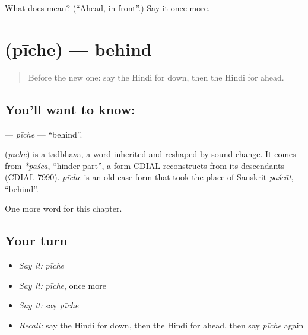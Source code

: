 \begin{tcolorbox}[breakable,colback=teal!4,colframe=teal!35!black,title={Before you move on}]
What does  mean? (\textquotedblleft{}Ahead, in front\textquotedblright{}.) Say it once more.
\end{tcolorbox}
\section[\texorpdfstring{\hi{पीछे} (pīche)}{पीछे (pīche)}]{ (pīche) — behind}

\label{lesson:HI-C235-piche}



\begin{quote}
Before the new one: say the Hindi for down, then the Hindi for ahead.
\end{quote}

\subsection*{You'll want to know: }
\textbf{} — \emph{pīche} — \textquotedblleft{}behind\textquotedblright{}.

\begin{cousinweb}
\textbf{} (\emph{pīche}) is a tadbhava, a word inherited and reshaped by sound change. It comes from \emph{*paśca}, \textquotedblleft{}hinder part\textquotedblright{}, a form CDIAL reconstructs from its descendants (CDIAL 7990). \emph{pīche} is an old case form that took the place of Sanskrit \emph{paścāt}, \textquotedblleft{}behind\textquotedblright{}.
\end{cousinweb}

\begin{grammarlens}[title={What you've built}]
One more word for this chapter.
\end{grammarlens}

\subsection*{Your turn}
\begin{itemize}
\raggedright
  \item \emph{Say it:} \emph{pīche}
  \item \emph{Say it:} \emph{pīche}, once more
  \item \emph{Say it:} say \emph{pīche}
  \item \emph{Recall:} say the Hindi for down, then the Hindi for ahead, then say \emph{pīche} again
\end{itemize}

